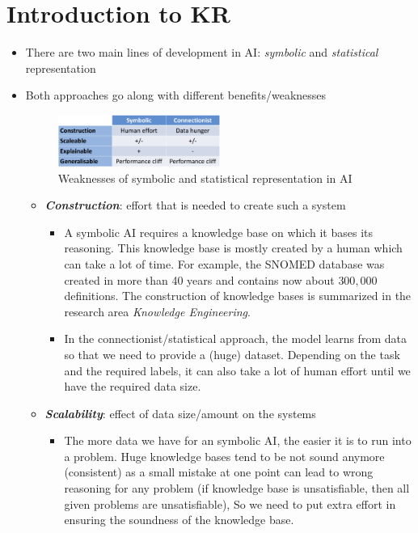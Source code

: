 \section{Introduction to KR}
\begin{itemize}
	\item There are two main lines of development in AI: \textit{symbolic} and \textit{statistical} representation
	\item Both approaches go along with different benefits/weaknesses
	\begin{figure}[ht!]
		\centering
		\includegraphics[width=0.5\textwidth]{figures/kr_intro_symbolic_vs_statistical.png}
		\caption{Weaknesses of symbolic and statistical representation in AI}
	\end{figure}
	\begin{itemize}
		\item \textit{\textbf{Construction}}: effort that is needed to create such a system
		\begin{itemize}
			\item A symbolic AI requires a knowledge base on which it bases its reasoning. This knowledge base is mostly created by a human which can take a lot of time. For example, the SNOMED database was created in more than 40 years and contains now about $300,000$ definitions. The construction of knowledge bases is summarized in the research area \textit{Knowledge Engineering}.
			\item In the connectionist/statistical approach, the model learns from data so that we need to provide a (huge) dataset. Depending on the task and the required labels, it can also take a lot of human effort until we have the required data size.
		\end{itemize}
		\item \textit{\textbf{Scalability}}: effect of data size/amount on the systems
		\begin{itemize}
			\item The more data we have for an symbolic AI, the easier it is to run into a problem. Huge knowledge bases tend to be not sound anymore (consistent) as a small mistake at one point can lead to wrong reasoning for any problem (if knowledge base is unsatisfiable, then all given problems are unsatisfiable), So we need to put extra effort in ensuring the soundness of the knowledge base.

\end{itemize}
\end{itemize}
\end{itemize}
